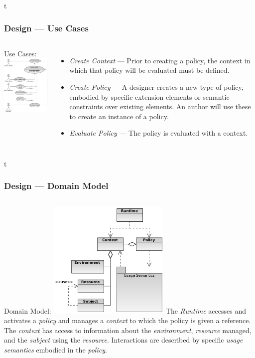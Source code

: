\documentclass[t, 10pt]{beamer}
\begin{document}
\begin{frame}{t}
\frametitle{Design --- Use Cases}
\begin{columns}[t]
Use Cases:
\includegraphics[width=2.3in]{use-cases}
\begin{itemize}
\item<2-> \textit{Create Context} --- Prior to creating a policy, the context in which that policy will be evaluated must be defined.
\item<3-> \textit{Create Policy} --- A designer creates a new type of policy, embodied by specific extension elements or semantic constraints over existing elements.  An author will use these to create an instance of a policy.
\item<4-> \textit{Evaluate Policy} --- The policy is evaluated with a context.
\end{itemize}
\end{columns}
\end{frame}

\begin{frame}{t}
\frametitle{Design --- Domain Model}
\begin{columns}[t]
Domain Model:
\includegraphics[width=2.3in]{ontology}
\pause
The \textit{Runtime} accesses and activates a \textit{policy} and manages a \textit{context} to which the policy is given a reference.
\newline
\newline
\pause
The \textit{context} has access to information about the \textit{environment}, \textit{resource} managed, and the \textit{subject} using the \textit{resource}. 
\newline
\newline
\pause
Interactions are described by specific \textit{usage semantics} embodied in the \textit{policy}.
\end{columns}
\end{frame}
\end{document}
